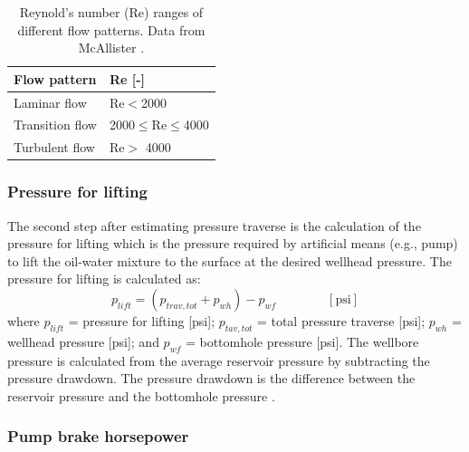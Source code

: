 \documentclass[11pt]{report}
\newcommand{\eqnunit}[1]{\quad\quad \scriptstyle{\left[\text{#1}\right]}}
\begin{document}
\begin{table}
\begin{scriptsize}
\caption{Reynold's number (Re) ranges of different flow patterns. Data from McAllister \cite{Mcallister2009}.}
\label{tab:NRe_ranges}
\begin{tabular*}{0.75\columnwidth}{p{}p{}}
\toprule
Flow pattern & Re [-] \\
\midrule
Laminar flow & Re$<$2000 \\
Transition flow & 2000$\leq$Re$\leq$4000 \\
Turbulent flow & Re$>$ 4000 \\
\bottomrule
\end{tabular*}
\end{scriptsize}
\end{table}



\subsubsection{Pressure for lifting}

The second step after estimating pressure traverse is the calculation of the pressure for lifting which is the pressure required by artificial means (e.g., pump) to lift the oil-water mixture to the surface at the desired wellhead pressure. The pressure for lifting is calculated as:
\begin{equation} \label{eq:pressure_lifting}
p_{lift}=(p_{trav,tot}+p_{wh})-p_{wf} \quad\quad\eqnunit{psi}
\end{equation}
where $p_{lift}$ = pressure for lifting [\unit{psi}]; $p_{tav,tot}$ = total pressure traverse [\unit{psi}]; $p_{wh}$ = wellhead pressure [\unit{psi}]; and $p_{wf}$ = bottomhole pressure [\unit{psi}]. The wellbore pressure is calculated from the average reservoir pressure by subtracting the pressure drawdown. The pressure drawdown is the difference between the reservoir pressure and the bottomhole pressure \cite[p. 22]{Takacs2005}.

\subsubsection{Pump brake horsepower} \label{sec:brake horsepower}
\end{document}
